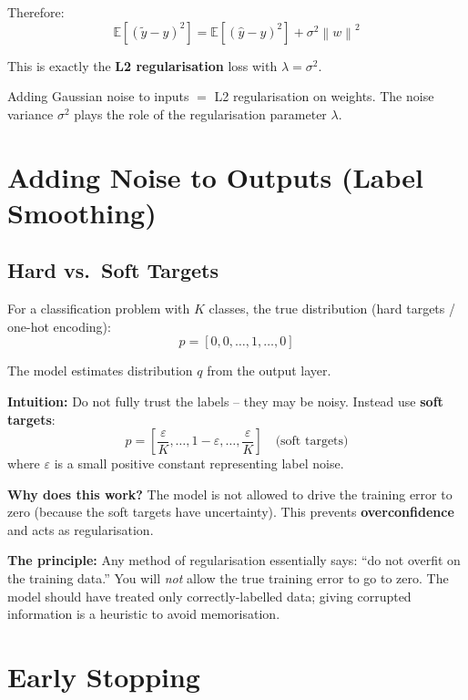 \documentclass[12pt,a4paper]{article}
\newcommand{\E}{\mathbb{E}}
\newcommand{\norm}[1]{\left\|#1\right\|}
\begin{document}
Therefore:
\[
\boxed{
\E[(\tilde{y}-y)^2]
= \E[(\hat{y}-y)^2] + \sigma^2\norm{w}^2
}
\]

This is exactly the \textbf{L2 regularisation} loss with $\lambda = \sigma^2$.

\begin{keybox}
Adding Gaussian noise to inputs $=$ L2 regularisation on weights. The noise variance $\sigma^2$ plays the role of the regularisation parameter $\lambda$.
\end{keybox}

\section{Adding Noise to Outputs (Label Smoothing)}

\subsection{Hard vs.\ Soft Targets}

For a classification problem with $K$ classes, the true distribution (hard targets / one-hot encoding):
\[
p = [0, 0, \ldots, 1, \ldots, 0]
\]

The model estimates distribution $q$ from the output layer.

\textbf{Intuition:} Do not fully trust the labels -- they may be noisy. Instead use \textbf{soft targets}:
\[
p = \left[\frac{\varepsilon}{K}, \ldots, 1-\varepsilon, \ldots, \frac{\varepsilon}{K}\right]
\quad\text{(soft targets)}
\]
where $\varepsilon$ is a small positive constant representing label noise.

\textbf{Why does this work?} The model is not allowed to drive the training error to zero (because the soft targets have uncertainty). This prevents \textbf{overconfidence} and acts as regularisation.

\textbf{The principle:} Any method of regularisation essentially says: ``do not overfit on the training data.'' You will \emph{not} allow the true training error to go to zero. The model should have treated only correctly-labelled data; giving corrupted information is a heuristic to avoid memorisation.

\section{Early Stopping}
\end{document}
